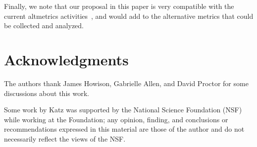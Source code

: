 \documentclass[a4paper,10pt]{article}
\begin{document}
Finally, we note that our proposal in this paper is very compatible with the current altmetrics activities~\cite{altmetrics}, and would add to the alternative metrics that could be collected and analyzed.

\section*{Acknowledgments}

The authors thank James Howison, Gabrielle Allen, and David Proctor for some discussions about this work.

Some work by Katz was supported by the National Science Foundation (NSF) while working at the Foundation; any opinion, finding, and conclusions or recommendations expressed in this material are those of the author and do not necessarily reflect the views of the NSF.



\end{document}
